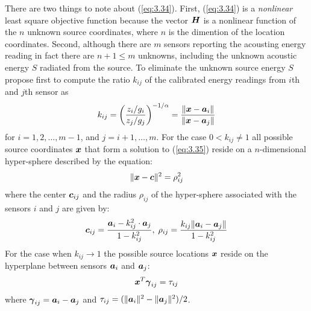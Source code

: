 There are two things to note about (\ref{eq:3.34}). First, (\ref{eq:3.34}) is a \textit{nonlinear} least square objective function because the vector $\mbox{\boldmath$H$}$ is a nonlinear function of the $n$  unknown source coordinates, where $n$ is the dimention of the location coordinates. Second, although there are $m$ sensors reporting the acousting energy reading in fact there are $n + 1 \leq m$ unknowns, including the unknown acoustic energy $S$ radiated from the source. 
To eliminate the unknown source energy $S$ \cite{ShengHu}  propose first to compute the ratio $k_{ij}$ of the calibrated energy readings from $i$th and $j$th sensor as
\begin{equation} \label{eq:3.35}
k_{ij} = \left( \frac{z_i / g_i}{z_j / g_j} \right)^{-1/\alpha} = \frac{\|\mbox{\boldmath$x$} - \mbox{\boldmath$a$}_i\|}{\|\mbox{\boldmath$x$} - \mbox{\boldmath$a$}_j\|}
\end{equation}
for $i = 1, 2, \ldots, m-1$, and $j = i+1, \ldots, m$. For the case $0 < k_{ij} \neq 1$ all possible source coordinates $\mbox{\boldmath$x$}$ that form a solution to (\ref{eq:3.35}) reside on a $n$-dimensional hyper-sphere described by the equation:
\begin{equation} \label{eq:3.36}
\| \mbox{\boldmath$x$} - \mbox{\boldmath$c$} \|^2 = \rho_{ij}^2
\end{equation}
where the center $\mbox{\boldmath$c$}_{ij}$ and the radius $\rho_{ij}$ of the hyper-sphere associated with the sensors $i$ and $j$  are given by:
\begin{equation} \label{eq:3.37}
\mbox{\boldmath$c$}_{ij} = \frac{\mbox{\boldmath$a$}_i - k_{ij}^2\cdot\mbox{\boldmath$a$}_j}{1-k_{ij}^2}, \;
 \rho_{ij} = \frac{k_{ij}\|\mbox{\boldmath$a$}_i - \mbox{\boldmath$a$}_j\|}{1-k_{ij}^2}
\end{equation}
For the case when $k_{ij} \rightarrow 1$ the possible source locations $\mbox{\boldmath$x$}$ reside on the hyperplane between sensors $\mbox{\boldmath$a$}_i$ and $\mbox{\boldmath$a$}_j$:
\begin{equation}
\nonumber
\mbox{\boldmath$x$}^T \mbox{\boldmath${\gamma}$}_{ij} = \tau_{ij}
\end{equation}
where $\mbox{\boldmath${\gamma}$}_{ij} = \mbox{\boldmath$a$}_i - \mbox{\boldmath$a$}_j$ and $\tau_{ij} = (\|\mbox{\boldmath$a$}_i\|^2 - \|\mbox{\boldmath$a$}_j\|^2) / 2$. 

